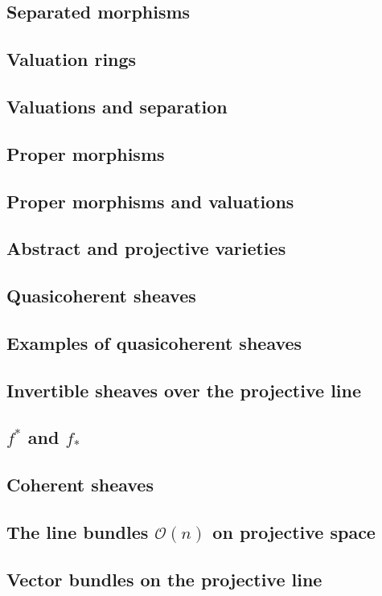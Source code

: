 \documentclass [11 pt, oneside, margin = 1 in] {article}
\begin{document}
\subsection{Separated morphisms}
\subsection{Valuation rings}
\subsection{Valuations and separation}
\subsection{Proper morphisms}
\subsection{Proper morphisms and valuations}
\subsection{Abstract and projective varieties}
\subsection{Quasicoherent sheaves}
\subsection{Examples of quasicoherent sheaves}
\subsection{Invertible sheaves over the projective line}
\subsection{$f^*$ and $f_*$}
\subsection{Coherent sheaves}
\subsection{The line bundles $\mathscr O(n)$ on projective space}
\subsection{Vector bundles on the projective line}
\end{document}
